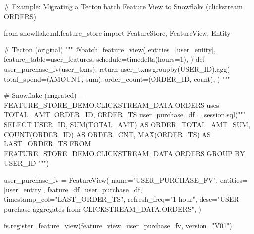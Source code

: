 \documentclass[
  letterpaper,
  DIV=11,
  numbers=noendperiod]{scrreprt}
\newenvironment{Shaded}{\begin{snugshade}}{\end{snugshade}}
\newcommand{\CommentTok}[1]{\textcolor[rgb]{0.37,0.37,0.37}{#1}}
\newcommand{\ImportTok}[1]{\textcolor[rgb]{0.00,0.46,0.62}{#1}}
\newcommand{\NormalTok}[1]{\textcolor[rgb]{0.00,0.23,0.31}{#1}}
\newcommand{\OperatorTok}[1]{\textcolor[rgb]{0.37,0.37,0.37}{#1}}
\newcommand{\StringTok}[1]{\textcolor[rgb]{0.13,0.47,0.30}{#1}}
\begin{document}
\begin{Shaded}
\begin{Highlighting}[]
\CommentTok{\# Example: Migrating a Tecton batch Feature View to Snowflake (clickstream ORDERS)}

\ImportTok{from}\NormalTok{ snowflake.ml.feature\_store }\ImportTok{import}\NormalTok{ FeatureStore, FeatureView, Entity}

\CommentTok{\# Tecton (original)}
\CommentTok{"""}
\CommentTok{@batch\_feature\_view(}
\CommentTok{    entities=[user\_entity],}
\CommentTok{    feature\_table=user\_features,}
\CommentTok{    schedule=timedelta(hours=1),}
\CommentTok{)}
\CommentTok{def user\_purchase\_fv(user\_txns):}
\CommentTok{    return user\_txns.groupby(\textquotesingle{}USER\_ID\textquotesingle{}).agg(}
\CommentTok{        total\_spend=(\textquotesingle{}AMOUNT\textquotesingle{}, \textquotesingle{}sum\textquotesingle{}),}
\CommentTok{        order\_count=(\textquotesingle{}ORDER\_ID\textquotesingle{}, \textquotesingle{}count\textquotesingle{}),}
\CommentTok{    )}
\CommentTok{"""}

\CommentTok{\# Snowflake (migrated) — FEATURE\_STORE\_DEMO.CLICKSTREAM\_DATA.ORDERS uses TOTAL\_AMT, ORDER\_ID, ORDER\_TS}
\NormalTok{user\_purchase\_df }\OperatorTok{=}\NormalTok{ session.sql(}\StringTok{"""}
\StringTok{    SELECT}
\StringTok{        USER\_ID,}
\StringTok{        SUM(TOTAL\_AMT) AS ORDER\_TOTAL\_AMT\_SUM,}
\StringTok{        COUNT(ORDER\_ID) AS ORDER\_CNT,}
\StringTok{        MAX(ORDER\_TS) AS LAST\_ORDER\_TS}
\StringTok{    FROM FEATURE\_STORE\_DEMO.CLICKSTREAM\_DATA.ORDERS}
\StringTok{    GROUP BY USER\_ID}
\StringTok{"""}\NormalTok{)}

\NormalTok{user\_purchase\_fv }\OperatorTok{=}\NormalTok{ FeatureView(}
\NormalTok{    name}\OperatorTok{=}\StringTok{"USER\_PURCHASE\_FV"}\NormalTok{,}
\NormalTok{    entities}\OperatorTok{=}\NormalTok{[user\_entity],}
\NormalTok{    feature\_df}\OperatorTok{=}\NormalTok{user\_purchase\_df,}
\NormalTok{    timestamp\_col}\OperatorTok{=}\StringTok{"LAST\_ORDER\_TS"}\NormalTok{,}
\NormalTok{    refresh\_freq}\OperatorTok{=}\StringTok{"1 hour"}\NormalTok{,}
\NormalTok{    desc}\OperatorTok{=}\StringTok{"USER purchase aggregates from CLICKSTREAM\_DATA.ORDERS"}\NormalTok{,}
\NormalTok{)}

\NormalTok{fs.register\_feature\_view(feature\_view}\OperatorTok{=}\NormalTok{user\_purchase\_fv, version}\OperatorTok{=}\StringTok{"V01"}\NormalTok{)}
\end{Highlighting}
\end{Shaded}
\end{document}
